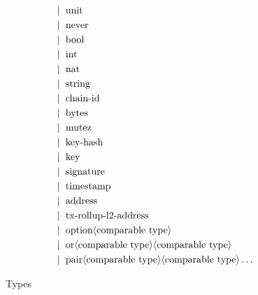 \documentclass[runningheads]{llncs}
\begin{document}
\begin{figure} []
\begin{align*}
   &\mid\ \text{unit} \\
   &\mid\ \text{never} \\
   &\mid\ \text{bool} \\
   &\mid\ \text{int}\\
   &\mid\ \text{nat}\\
   &\mid\ \text{string}\\
   &\mid\ \text{chain-id}\\
   &\mid\ \text{bytes}\\
   &\mid\ \text{mutez}\\
   &\mid\ \text{key-hash}\\
   &\mid\ \text{key}\\
   &\mid\ \text{signature}\\
   &\mid\ \text{timestamp}\\
   &\mid\ \text{address}\\
   &\mid\ \text{tx-rollup-l2-address}\\
   &\mid\ \text{option} \langle\text{comparable type}\rangle\\
   &\mid\ \text{or} \langle\text{comparable type}\rangle \langle\text{comparable type}\rangle\\
   &\mid\ \text{pair} \langle\text{comparable type}\rangle \langle\text{comparable type}\rangle \dots \\
\end{align*}
\caption{Types}
\label{fig:type}
\end{figure}
\end{document}
